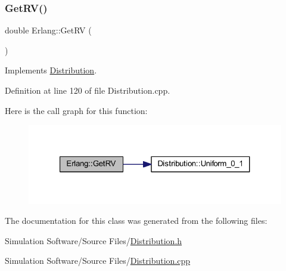 \subsubsection{\texorpdfstring{Get\+R\+V()}{GetRV()}}
{\footnotesize\ttfamily double Erlang\+::\+Get\+RV (\begin{DoxyParamCaption}{ }\end{DoxyParamCaption})\hspace{0.3cm}{\ttfamily [virtual]}}



Implements \hyperlink{class_distribution_a63b433850d7b47d84eb69448f7916719}{Distribution}.



Definition at line 120 of file Distribution.\+cpp.

Here is the call graph for this function\+:
\nopagebreak
\begin{figure}[H]
\begin{center}
\leavevmode
\includegraphics[width=321pt]{class_erlang_a5ae5b56e37bd2c5ee4318fcc12259442_cgraph}
\end{center}
\end{figure}


The documentation for this class was generated from the following files\+:\begin{DoxyCompactItemize}
\item 
Simulation Software/\+Source Files/\hyperlink{_distribution_8h}{Distribution.\+h}\item 
Simulation Software/\+Source Files/\hyperlink{_distribution_8cpp}{Distribution.\+cpp}\end{DoxyCompactItemize}
